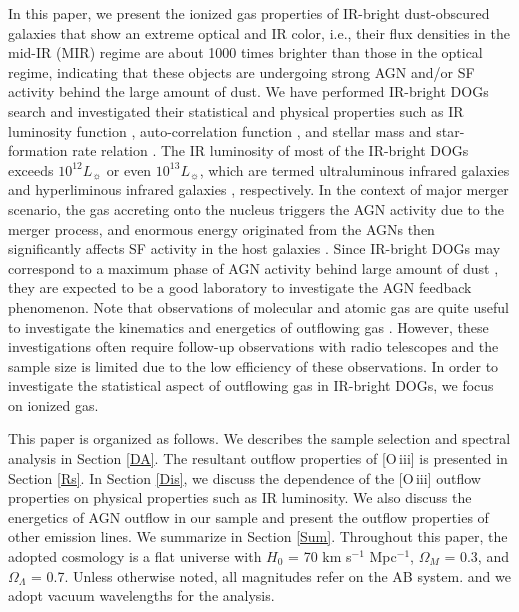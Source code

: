 \documentclass[twocolumn]{aastex6}
\newcommand{\oiii}{[O{\,\sc iii}]\,\,}
\begin{document}
In this paper, we present the ionized gas properties of IR-bright dust-obscured galaxies \citep[DOGs:][]{Dey, Toba_15} that show an extreme optical and IR color, i.e., their flux densities in the mid-IR (MIR) regime are about 1000 times brighter than those in the optical regime, indicating that these objects are undergoing strong AGN and/or SF activity behind the large amount of dust.
We have performed IR-bright DOGs search and investigated their statistical and physical properties such as IR luminosity function \citep{Toba_15}, auto-correlation function \citep{Toba_17a}, and stellar mass and star-formation rate relation \citep{Toba_17b}.
The IR luminosity of most of the IR-bright DOGs exceeds $10^{12} L_{\sun}$ or even $10^{13} L_{\sun}$, which are termed ultraluminous infrared galaxies \citep[ULIRGs:][]{Sanders} and hyperliminous infrared galaxies \citep[HyLIRGs:][]{Rowan-Robinson}, respectively.
In the context of major merger scenario, the gas accreting onto the nucleus triggers the AGN activity due to the merger process, and enormous energy originated from the AGNs then significantly affects SF activity in the host galaxies \citep[e.g.,][]{Hopkins_06,Hopkins_08}.
Since IR-bright DOGs may correspond to a maximum phase of AGN activity behind large amount of dust \citep[e.g.,][]{Narayanan}, they are expected to be a good laboratory to investigate the AGN feedback phenomenon.
Note that observations of molecular and atomic gas are quite useful to investigate the kinematics and energetics of outflowing gas \citep[e.g.,][]{Cicone}.
However, these investigations often require follow-up observations with radio telescopes and the sample size is limited due to the low efficiency of these observations.
In order to investigate the statistical aspect of outflowing gas in IR-bright DOGs, we focus on ionized gas.

This paper is organized as follows. 
We describes the sample selection and spectral analysis in Section \ref{DA}.
The resultant outflow properties of \oiii is presented in Section \ref{Rs}.
In Section \ref{Dis}, we discuss the dependence of the \oiii outflow properties on physical properties such as IR luminosity. 
We also discuss the energetics of AGN outflow in our sample and present the outflow properties of other emission lines. 
We summarize in Section \ref{Sum}.
Throughout this paper, the adopted cosmology is a flat universe with $H_0$ = 70 km s$^{-1}$ Mpc$^{-1}$, $\Omega_M$ = 0.3, and $\Omega_{\Lambda}$ = 0.7. Unless otherwise noted, all magnitudes refer on the AB system. and we adopt vacuum wavelengths for the analysis.\\
\end{document}
